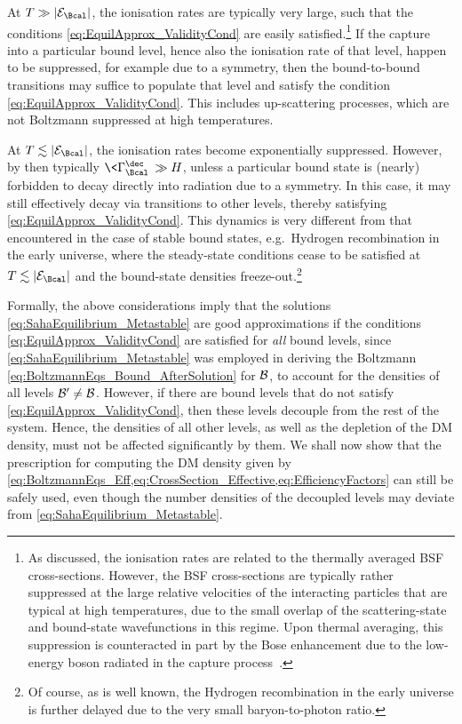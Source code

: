 \documentclass[preprint,5p,twocolumn]{elsarticle}
\begin{document}
At $T \gg |{\cal E}_{\Bcal}|$, the ionisation rates are typically very large, such that the conditions \eqref{eq:EquilApprox_ValidityCond} are easily satisfied.\footnote{
As discussed, the ionisation rates are related to the thermally averaged BSF cross-sections. However, the BSF cross-sections are typically rather suppressed at the large relative velocities of the interacting particles that are typical at high temperatures, due to the small overlap of the scattering-state and bound-state wavefunctions in this regime. Upon thermal averaging, this suppression is counteracted in part by the Bose enhancement due to the low-energy boson radiated in the capture process~\cite{vonHarling:2014kha}.} 
If the capture into a particular bound level, hence also the ionisation rate of that level, happen to be suppressed, for example due to a symmetry, then the bound-to-bound transitions may suffice to populate that level and satisfy the condition \eqref{eq:EquilApprox_ValidityCond}. This includes up-scattering processes, which are not Boltzmann suppressed at high temperatures.

At $T \lesssim |{\cal E}_{\Bcal}|$, the ionisation rates become exponentially suppressed. However, by then typically $\<\Gamma_{\Bcal}^{\dec}\> \gg H$, unless a particular bound state is (nearly) forbidden to decay directly into radiation due to a symmetry. In this case, it may still effectively decay via transitions to other levels, thereby satisfying \eqref{eq:EquilApprox_ValidityCond}. 
This dynamics is very different from that encountered in the case of stable bound states, e.g.~Hydrogen recombination in the early universe, where the steady-state conditions cease to be satisfied at $T \lesssim |{\cal E}_{\Bcal}|$ and the bound-state densities freeze-out.\footnote{Of course, as is well known, the Hydrogen recombination in the early universe is further delayed due to the very small baryon-to-photon ratio.}  

\medskip

Formally, the above considerations imply that the solutions \eqref{eq:SahaEquilibrium_Metastable} are good approximations if the conditions \eqref{eq:EquilApprox_ValidityCond} are satisfied for \emph{all} bound levels, since \eqref{eq:SahaEquilibrium_Metastable} was employed in deriving the Boltzmann \cref{eq:BoltzmannEqs_Bound_AfterSolution} for ${\cal B}$, to account for the densities of all levels ${\cal B}' \neq {\cal B}$. However, if there are bound levels that do not satisfy \eqref{eq:EquilApprox_ValidityCond}, then these levels decouple from the rest of the system. Hence, the densities of all other levels, as well as the depletion of the DM density, must not be affected significantly by them. We shall now show that the prescription for computing the DM density given by  \cref{eq:BoltzmannEqs_Eff,eq:CrossSection_Effective,eq:EfficiencyFactors} can still be safely used, even though the number densities of the decoupled levels may deviate from \eqref{eq:SahaEquilibrium_Metastable}.  
\end{document}
